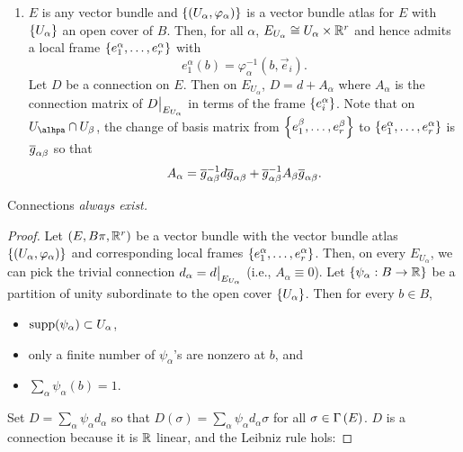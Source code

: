 \documentclass[main.tex]{subfiles}
\begin{document}
\begin{exmp}
\begin{enumerate}
        \item $E$ is any vector bundle and $\left\{ \left( U_\alpha, \varphi_\alpha \right)\right\}$ is a vector bundle atlas for $E$ with $\left\{U_\alpha\right\}$ an open cover of $B$. Then, for all $\alpha$, $E_{U_\alpha} \cong U_\alpha \times \mathbb{R}^r$ and hence admits a local frame $\left\{ e_1^\alpha, \dots, e_r^\alpha \right\}$ with
        \[
        e_1^\alpha(b) = \varphi_\alpha^{-1}(b, \vec{e}_i).
        \] Let $D$ be a connection on $E$. Then on $E_{U_\alpha}$, $D = d + A_\alpha$ where $A_\alpha$ is the connection matrix of $D\big|_{E_{U_\alpha}}$ in terms of the frame $\left\{e_i^\alpha\right\}$. Note that on $U_\alhpa \cap U_\beta$, the change of basis matrix from $\left\{e_1^\beta, \dots, e_r^\beta \right\}$ to $\left\{ e_1^\alpha, \dots, e_r^\alpha \right\}$ is $\overline{g}_{\alpha\beta}$ so that
        \[
        A_\alpha = \overline{g}_{\alpha\beta}^{-1}d\overline{g}_{\alpha\beta} + \overline{g}_{\alpha\beta}^{-1} A_\beta \overline{g}_{\alpha\beta}.
        \]
    \end{enumerate}
    \end{exmp}

    \begin{prop}
        Connections \it{always} exist.
    \end{prop}

    \begin{proof}
        Let $(E,B \pi, \mathbb{R}^r)$ be a vector bundle with the vector bundle atlas $\left\{\left( U_\alpha, \varphi_\alpha \right)\right\}$ and corresponding local frames $\left\{e_1^\alpha, \dots, e_r^\alpha\right\}$. Then, on every $E_{U_\alpha}$, we can pick the trivial connection $d_\alpha  = d\big|_{E_{U_\alpha}}$ (i.e., $A_\alpha \equiv 0$). Let $\left\{\psi_\alpha: B \to \mathbb{R} \right\}$ be a partition of unity subordinate to the open cover $\left\{U_\alpha\right\}$. Then for every $b\in B$,
        \begin{itemize}
            \item $\text{supp}(\psi_\alpha) \subset U_\alpha$,
            \item only a finite number of $\psi_\alpha$'s are nonzero at $b$, and
            \item $\sum_\alpha \psi_\alpha(b) = 1$.
        \end{itemize}
        Set $D = \sum_\alpha \psi_\alpha d_\alpha$ so that $D(\sigma) = \sum_\alpha \psi_\alpha d_\alpha \sigma$ for all $\sigma \in \Gamma\left( E \right)$. $D$ is a connection because it is $\mathbb{R}$ linear, and the Leibniz rule hols:
    \end{proof}
\end{document}

